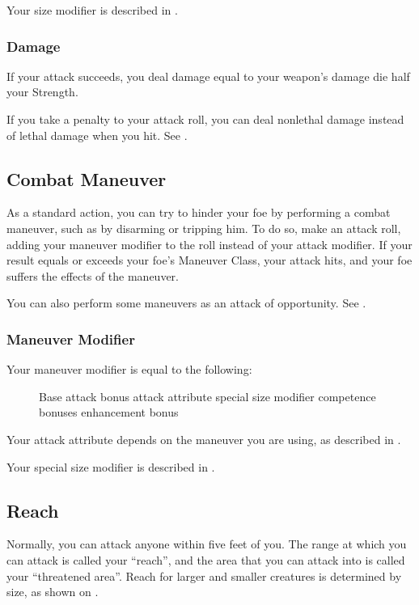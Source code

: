 Your size modifier is described in .

\subsubsection{Damage}
If your attack succeeds, you deal damage equal to your weapon's damage die \add half your Strength.

 If you take a  penalty to your attack roll, you can deal nonlethal damage instead of lethal damage when you hit. See .

\subsection{Combat Maneuver}\label{Combat Maneuver}
As a standard action, you can try to hinder your foe by performing a combat maneuver, such as by disarming or tripping him. To do so, make an attack roll, adding your maneuver modifier to the roll instead of your attack modifier. If your result equals or exceeds your foe's Maneuver Class, your attack hits, and your foe suffers the effects of the maneuver.

You can also perform some maneuvers as an attack of opportunity. See .

\subsubsection{Maneuver Modifier}
Your maneuver modifier is equal to the following:

\begin{figure}[h]
\centering Base attack bonus \add attack attribute \add special size modifier \add competence bonuses \add enhancement bonus
\end{figure}

Your attack attribute depends on the maneuver you are using, as described in .

Your special size modifier is described in .

\subsection{Reach}\label{Reach}
Normally, you can attack anyone within five feet of you. The range at which you can attack is called your ``reach'', and the area that you can attack into is called your ``threatened area''. Reach for larger and smaller creatures is determined by size, as shown on .


